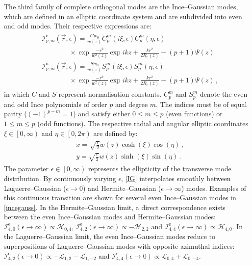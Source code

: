 \documentclass[../Thesis-IJspeert.tex]{subfiles}
\begin{document}
The third family of complete orthogonal modes are the Ince--Gaussian modes, which are defined in an elliptic coordinate system and are subdivided into even and odd modes. Their respective expressions are:
\begin{align}
\label{IG}
\begin{split}
&\mathcal{I}_{p,m}^{\mathrm{e}}(\vec{r}, \epsilon) = \frac{C w_0}{w(z)} C_p^m(i \xi, \epsilon) C_p^m(\eta, \epsilon)  \\
&\hspace{4em} \times \exp{\frac{-r^2}{w^2(z)}}\exp{i k z + \frac{k r^2}{2R_\mathrm{c}(z)} - (p + 1) \Psi(z)} \\ &\mathcal{I}_{p,m}^{\mathrm{o}}(\vec{r}, \epsilon) = \frac{S w_0}{w(z)} S_p^m(i \xi, \epsilon) S_p^m(\eta, \epsilon)  \\
&\hspace{4em} \times \exp{\frac{-r^2}{w^2(z)}}\exp{i k z + \frac{k r^2}{2R_\mathrm{c}(z)} - (p + 1) \Psi(z)}
\,,
\end{split}
\end{align}
in which $C$ and $S$ represent normalisation constants. $C_p^m$ and $S_p^m$ denote the even and odd Ince polynomials of order $p$ and degree $m$. The indices must be of equal parity ($(-1)^{p-m}=1$) and satisfy either $0 \leq m \leq p$ (even functions) or $1 \leq m \leq p$ (odd functions). The respective radial and angular elliptic coordinates $\xi\in \left[0,\infty \right)$ and $\eta\in\left[0,2\pi\right)$ are defined by:
\begin{align}
\begin{split}
&x = \sqrt{\frac{\epsilon}{2}} w(z) \cosh(\xi)\cos(\eta)\,,\\
&y = \sqrt{\frac{\epsilon}{2}} w(z) \sinh(\xi)\sin(\eta)\,.
\end{split}
\end{align}
The parameter $\epsilon\in\left[0,\infty \right)$ represents the ellipticity of the transverse mode distribution. By continuously varying $\epsilon$, \autoref{IG} interpolates smoothly between Laguerre--Gaussian ($\epsilon\rightarrow 0$) and Hermite--Gaussian ($\epsilon\rightarrow \infty$) modes. Examples of this continuous transition are shown for several even Ince--Gaussian modes in \autoref{incegauss}. In the Hermite--Gaussian limit, a direct correspondence exists between the even Ince--Gaussian modes and Hermite--Gaussian modes: $\mathcal{I}_{4,0}^\mathrm{e}(\epsilon\rightarrow\infty)\propto \mathcal{H}_{0,4}$, $\mathcal{I}_{4,2}^\mathrm{e}(\epsilon\rightarrow\infty)\propto -\mathcal{H}_{2,2}$ and $\mathcal{I}_{4,4}^\mathrm{e}(\epsilon\rightarrow\infty)\propto \mathcal{H}_{4,0}$. In the Laguerre--Gaussian limit, the even Ince--Gaussian modes reduce to superpositions of Laguerre--Gaussian modes with opposite azimuthal indices: $\mathcal{I}_{4,2}^\mathrm{e}(\epsilon\rightarrow 0)\propto-\mathcal{L}_{1,2}-\mathcal{L}_{1,-2}$ and $\mathcal{I}_{4,4}^\mathrm{e}(\epsilon\rightarrow 0)\propto\mathcal{L}_{0,4}+\mathcal{L}_{0,-4}$.
\end{document}

